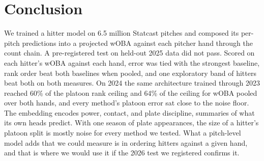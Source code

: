 \documentclass[11pt,letterpaper]{article}
\begin{document}
\section{Conclusion}
\label{sec:conclusion}

We trained a hitter model on 6.5 million Statcast pitches and composed its per-pitch predictions into a projected wOBA against each pitcher hand through the count chain. A pre-registered test on held-out 2025 data did not pass. Scored on each hitter's wOBA against each hand, error was tied with the strongest baseline, rank order beat both baselines when pooled, and one exploratory band of hitters beat both on both measures. On 2024 the same architecture trained through 2023 reached 60\% of the platoon rank ceiling and 64\% of the ceiling for wOBA pooled over both hands, and every method's platoon error sat close to the noise floor. The embedding encodes power, contact, and plate discipline, summaries of what its own heads predict. With one season of plate appearances, the size of a hitter's platoon split is mostly noise for every method we tested. What a pitch-level model adds that we could measure is in ordering hitters against a given hand, and that is where we would use it if the 2026 test we registered confirms it.

\clearpage


\end{document}

